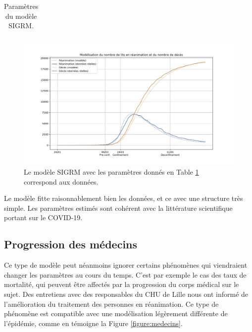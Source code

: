\documentclass[review]{elsarticle}
\begin{document}
\begin{table}
\small
\begin{center}
\begin{tabular}{|c|c|}
    \hline
 
      \hline
\end{tabular}
\end{center}
\caption{Paramètres du modèle SIGRM.}
\label{table:meilleur}
\end{table}

\begin{figure}
\begin{center}
\includegraphics[width=1\linewidth]{figures/meilleur.jpg}
\end{center}
\caption{Le modèle SIGRM avec les paramètres donnés en Table \ref{table:meilleur} correspond aux données.}
\label{figure:meilleur}
\end{figure}

Le modèle fitte raisonnablement bien les données, et ce avec une structure très simple. Les paramètres estimés sont cohérent avec la littérature scientifique portant sur le COVID-19. 

\subsection{Progression des médecins}

Ce type de modèle peut néanmoins ignorer certains phénomènes qui viendraient changer les paramètres au cours du temps. C'est par exemple le cas des taux de mortalité, qui peuvent être affectés par la progression du corps médical sur le sujet. Des entretiens avec des responsables du CHU de Lille nous ont informé de l'amélioration du traitement des personnes en réanimation. Ce type de phénomène est compatible avec une modélisation légèrement différente de l'épidémie, comme en témoigne la Figure \ref{figure:medecins}.
\end{document}
